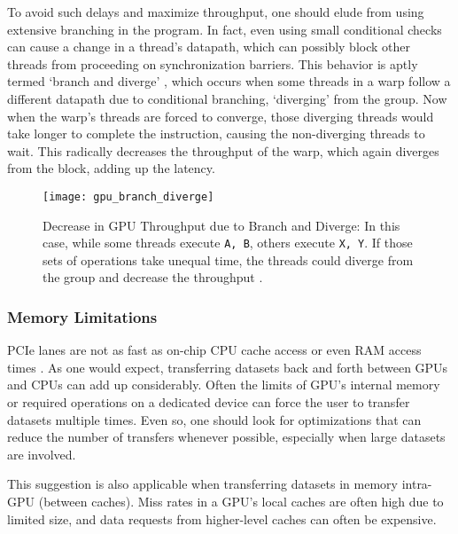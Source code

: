 To avoid such delays and maximize throughput, one should elude from using extensive branching in the program. In fact, even using small conditional checks can cause a change in a thread's datapath, which can possibly block other threads from proceeding on synchronization barriers. This behavior is aptly termed `branch and diverge' \cite{wong2010demystifying} \cite[Appendix~B]{PattersonARM}, which occurs when some threads in a warp follow a different datapath due to conditional branching, `diverging' from the group. Now when the warp's threads are forced to converge, those diverging threads would take longer to complete the instruction, causing the non-diverging threads to wait. This radically decreases the throughput of the warp, which again diverges from the block, adding up the latency.
\begin{figure}[!htbp]
    \centering
    \texttt{[image: gpu\_branch\_diverge]}
    \caption[Decrease in GPU Throughput due to Branch and Diverge]{Decrease in GPU Throughput due to Branch and Diverge: In this case, while some threads execute \texttt{A, B}, others execute \texttt{X, Y}. If those sets of operations take unequal time, the threads could diverge from the group and decrease the throughput \cite{ParallelNVIDIA}.}
\end{figure}

\subsubsection{Memory Limitations}
PCIe lanes are not as fast as on-chip CPU cache access or even RAM access times \cite{CUDADocs,ParallelNVIDIA}. As one would expect, transferring datasets back and forth between GPUs and CPUs can add up considerably. Often the limits of GPU's internal memory or required operations on a dedicated device can force the user to transfer datasets multiple times. Even so, one should look for optimizations that can reduce the number of transfers whenever possible, especially when large datasets are involved.

This suggestion is also applicable when transferring datasets in memory intra-GPU (between caches). Miss rates in a GPU's local caches are often high due to limited size, and data requests from higher-level caches can often be expensive.